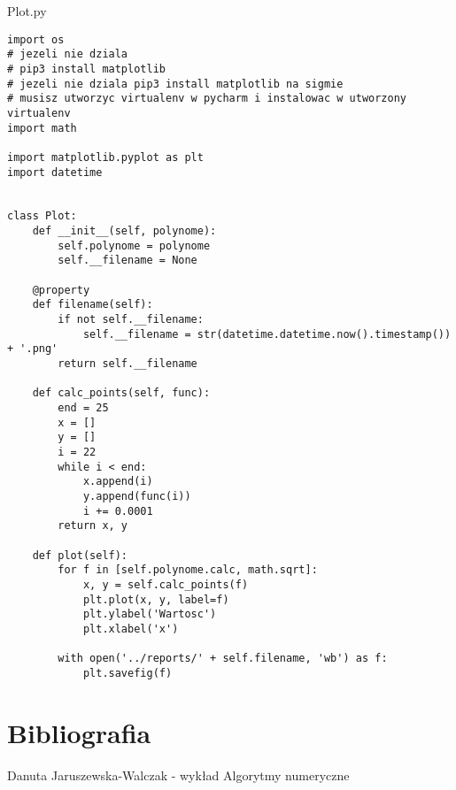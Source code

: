 \documentclass[12pt]{article}
\begin{document}
Plot.py
\begin{lstlisting}[frame=single]
import os
# jezeli nie dziala
# pip3 install matplotlib
# jezeli nie dziala pip3 install matplotlib na sigmie
# musisz utworzyc virtualenv w pycharm i instalowac w utworzony virtualenv
import math

import matplotlib.pyplot as plt
import datetime


class Plot:
    def __init__(self, polynome):
        self.polynome = polynome
        self.__filename = None

    @property
    def filename(self):
        if not self.__filename:
            self.__filename = str(datetime.datetime.now().timestamp()) + '.png'
        return self.__filename

    def calc_points(self, func):
        end = 25
        x = []
        y = []
        i = 22
        while i < end:
            x.append(i)
            y.append(func(i))
            i += 0.0001
        return x, y

    def plot(self):
        for f in [self.polynome.calc, math.sqrt]:
            x, y = self.calc_points(f)
            plt.plot(x, y, label=f)
            plt.ylabel('Wartosc')
            plt.xlabel('x')

        with open('../reports/' + self.filename, 'wb') as f:
            plt.savefig(f)
\end{lstlisting}

\section*{Bibliografia}
Danuta Jaruszewska-Walczak - wykład Algorytmy numeryczne
\end{document}
